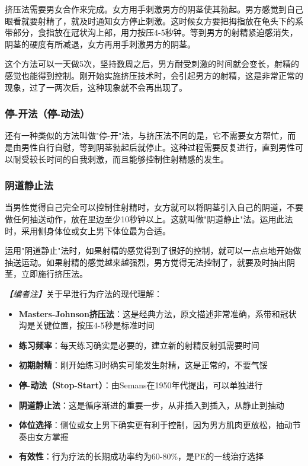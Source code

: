 挤压法需要男女合作来完成。女方用手刺激男方的阴茎使其勃起。男方感觉到自己眼看就要射精了，就及时通知女方停止刺激。这时候女方要把拇指放在龟头下的系带部分，食指放在冠状沟上部，用力按压4-5秒钟。等到男方的射精紧迫感消失，阴茎的硬度有所减退，女方再用手刺激男方的阴茎。

这个方法可以一天做5次，坚持数周之后，男方耐受刺激的时间就会变长，射精的感觉也能得到控制。刚开始实施挤压技术时，会引起男方的射精，这是非常正常的现象，过了一两次后，这种现象就不会再出现了。

\subsubsection{停-开法（停-动法）}

还有一种类似的方法叫做"停-开"法，与挤压法不同的是，它不需要女方帮忙，而是由男性自行自慰，等到阴茎勃起后就停止。这种过程需要反复进行，直到男性可以耐受较长时间的自我刺激，而且能够控制住射精感的发生。

\subsubsection{阴道静止法}

当男性觉得自己完全可以控制住射精时，女方就可以将阴茎引入自己的阴道，不要做任何抽送动作，放在里边至少10秒钟以上。这就叫做"阴道静止"法。运用此法时，采用侧身体位或女上男下体位最为合适。

运用"阴道静止"法时，如果射精的感觉得到了很好的控制，就可以一点点地开始做抽送运动。如果射精的感觉越来越强烈，男方觉得无法控制了，就要及时抽出阴茎，立即施行挤压法。

\noindent\textit{【编者注】}关于早泄行为疗法的现代理解：
\begin{itemize}
	\item \textbf{Masters-Johnson挤压法}：这是经典方法，原文描述非常准确，系带和冠状沟是关键位置，按压4-5秒是标准时间
	\item \textbf{练习频率}：每天练习确实是必要的，建立新的射精反射弧需要时间
	\item \textbf{初期射精}：刚开始练习时确实可能发生射精，这是正常的，不要气馁
	\item \textbf{停-动法（Stop-Start）}：由Semans在1950年代提出，可以单独进行
	\item \textbf{阴道静止法}：这是循序渐进的重要一步，从非插入到插入，从静止到抽动
	\item \textbf{体位选择}：侧位或女上男下确实更有利于控制，因为男方肌肉更放松，抽动节奏由女方掌握
	\item \textbf{有效性}：行为疗法的长期成功率约为60-80\%，是PE的一线治疗选择
\end{itemize}

